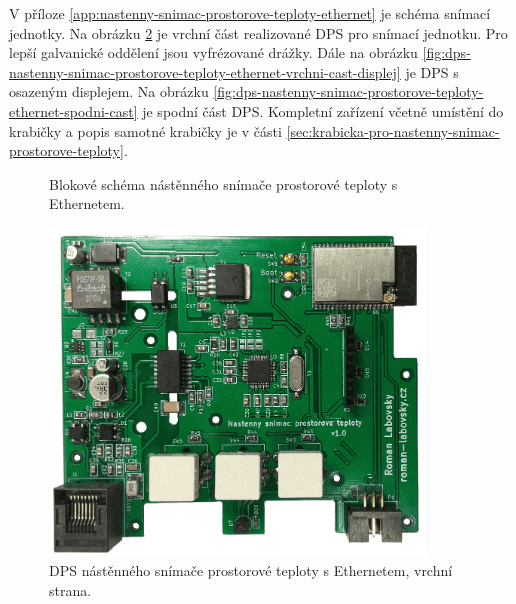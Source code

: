 V příloze \ref{app:nastenny-snimac-prostorove-teploty-ethernet} je schéma snímací jednotky. Na obrázku \ref{fig:dps-nastenny-snimac-prostorove-teploty-ethernet-vrchni-cast} je vrchní část realizované DPS pro snímací jednotku. Pro lepší galvanické oddělení jsou vyfrézované drážky. Dále na obrázku \ref{fig:dps-nastenny-snimac-prostorove-teploty-ethernet-vrchni-cast-displej} je DPS s osazeným displejem. Na obrázku \ref{fig:dps-nastenny-snimac-prostorove-teploty-ethernet-spodni-cast} je spodní část DPS. Kompletní zařízení včetně umístění do krabičky a popis samotné krabičky je v části \ref{sec:krabicka-pro-nastenny-snimac-prostorove-teploty}.

\begin{figure}[H]
    \centering
    \def\svgwidth{\columnwidth}
    
    \caption[]{Blokové schéma nástěnného snímače prostorové teploty s Ethernetem.}
    \label{fig:blokove-schema-nastenny-snimac-teploty-ethernet}
\end{figure}

\begin{figure}[H]
    \centering
    \includegraphics[width=0.89\textwidth]{images/nastenny-snimac-prostorove-teploty-ethernet/dps-nastenny-snimac-prostorove-teploty-ethernet-vrchni-cast.png}
    \caption{DPS nástěnného snímače prostorové teploty s Ethernetem, vrchní strana.}
    \label{fig:dps-nastenny-snimac-prostorove-teploty-ethernet-vrchni-cast}
\end{figure}

